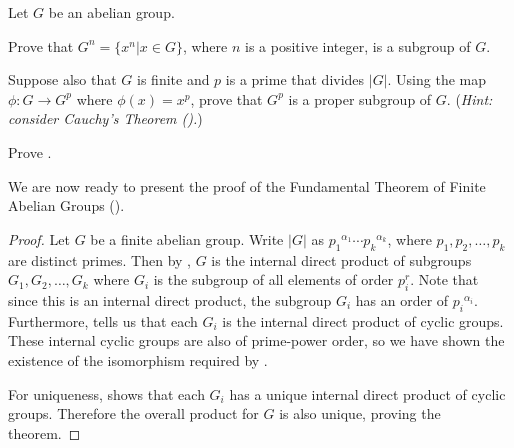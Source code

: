 \begin{exercise}\label{exercise-group-power-is-subgroup}
    Let $G$ be an abelian group.
    \begin{partquestions}{\roman*}
        \item Prove that $G^n = \{x^n \vert x \in G\}$, where $n$ is a positive integer, is a subgroup of $G$.
        \item Suppose also that $G$ is finite and $p$ is a prime that divides $|G|$. Using the map $\phi: G \to G^p$ where $\phi(x) = x^p$, prove that $G^p$ is a proper subgroup of $G$.\newline
        (\textit{Hint: consider Cauchy's Theorem ().})
    \end{partquestions}
\end{exercise}

\begin{exercise}\label{exercise-prove-lemma-fundamental-theorem-of-finite-abelian-groups-3}
    Prove .
\end{exercise}

\newpage

We are now ready to present the proof of the Fundamental Theorem of Finite Abelian Groups ().
\begin{proof}
    Let $G$ be a finite abelian group. Write $|G|$ as ${p_1}^{\alpha_1}\cdots{p_k}^{\alpha_k}$, where $p_1, p_2, \dots, p_k$ are distinct primes. Then by , $G$ is the internal direct product of subgroups $G_1, G_2, \dots, G_k$ where $G_i$ is the subgroup of all elements of order $p_i^r$. Note that since this is an internal direct product, the subgroup $G_i$ has an order of ${p_i}^{\alpha_i}$. Furthermore,  tells us that each $G_i$ is the internal direct product of cyclic groups. These internal cyclic groups are also of prime-power order, so we have shown the existence of the isomorphism required by .

    For uniqueness,  shows that each $G_i$ has a unique internal direct product of cyclic groups. Therefore the overall product for $G$ is also unique, proving the theorem.
\end{proof}

\newpage

